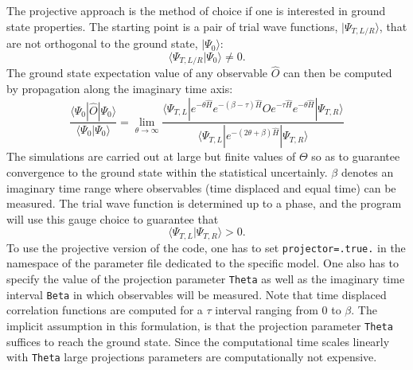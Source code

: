 

The projective  approach is the method of choice if  one is interested in ground state properties.     The starting point is a pair of trial wave functions,  $| \Psi_{T,L/R} \rangle  $,  that are  not orthogonal to the ground state,  $| \Psi_0 \rangle  $:
\begin{equation}
  \langle \Psi_{T,L/R}  | \Psi_0 \rangle  \neq 0. 
\end{equation}
The ground state expectation value of  any  observable  $\hat{O} $ can then be computed by  propagation along the imaginary time axis:
  \begin{equation}
	 \frac{ \langle \Psi_0 | \hat{O} | \Psi_0 \rangle }{ \langle \Psi_0 | \Psi_0 \rangle}   = \lim_{\theta \rightarrow \infty}  
	 \frac{ \langle \Psi_{T,L} | e^{-\theta \hat{H}}  e^{-(\beta - \tau)\hat{H}  }\hat{O} e^{- \tau  \hat{H} }   e^{-\theta \hat{H}} | \Psi_{T,R} \rangle } 
	        { \langle \Psi_{T,L} | e^{-(2 \theta + \beta) \hat{H}  } | \Psi_{T,R} \rangle } 
\end{equation}
The simulations are carried out at large  but finite values of  $\Theta$ so as to guarantee convergence to the ground  state within the statistical uncertainly.   $\beta$ denotes an imaginary time range where  observables 
(time displaced and equal time) can be measured.   The trial wave function is determined up to a phase, and the program will use this gauge choice to  guarantee  that
\begin{equation}
	 \langle \Psi_{T,L} | \Psi_{T,R} \rangle  > 0.
\end{equation}
To use  the projective version of the code, one has to  set  \texttt{projector=.true.}  in the  namespace  of the parameter file dedicated to the specific model. One also has to specify the value of the projection parameter  \texttt{Theta} as well as the
imaginary time interval \texttt{Beta} in which observables will be measured.    Note that time displaced correlation functions  are computed for a $\tau$  interval ranging from $0$ to $\beta$.  The implicit assumption  in this formulation, is that  the projection  parameter  \texttt{Theta}  suffices to reach the ground state.    Since the  computational time scales linearly with  \texttt{Theta}   large projections parameters are computationally not expensive. 


